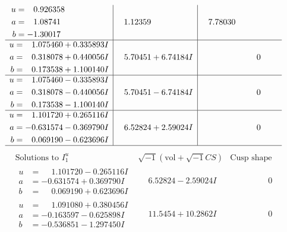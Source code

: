 \documentclass[1p]{elsarticle_modified}
\theoremstyle{definition}
\newcommand{\I}{\sqrt{-1}}
\begin{document}
$$\begin{array}{c|c|c}
\begin{aligned}
u &= \phantom{-}0.926358\phantom{ +0.000000I} \\
a &= \phantom{-}1.08741\phantom{ +0.000000I} \\
b &= -1.30017\phantom{ +0.000000I}\end{aligned}
 & \phantom{-}1.12359\phantom{ +0.000000I} & \phantom{-}7.78030\phantom{ +0.000000I} \\ \hline\begin{aligned}
u &= \phantom{-}1.075460 + 0.335893 I \\
a &= \phantom{-}0.318078 + 0.440056 I \\
b &= \phantom{-}0.173538 + 1.100140 I\end{aligned}
 & \phantom{-}5.70451 + 6.74184 I & \phantom{-0.000000 } 0 \\ \hline\begin{aligned}
u &= \phantom{-}1.075460 - 0.335893 I \\
a &= \phantom{-}0.318078 - 0.440056 I \\
b &= \phantom{-}0.173538 - 1.100140 I\end{aligned}
 & \phantom{-}5.70451 - 6.74184 I & \phantom{-0.000000 } 0 \\ \hline\begin{aligned}
u &= \phantom{-}1.101720 + 0.265116 I \\
a &= -0.631574 - 0.369790 I \\
b &= \phantom{-}0.069190 - 0.623696 I\end{aligned}
 & \phantom{-}6.52824 + 2.59024 I & \phantom{-0.000000 } 0\\
 \hline 
 \end{array}$$\newpage$$\begin{array}{c|c|c}  
\text{Solutions to }I^u_{1}& \I (\text{vol} + \sqrt{-1}CS) & \text{Cusp shape}\\
 \hline 
\begin{aligned}
u &= \phantom{-}1.101720 - 0.265116 I \\
a &= -0.631574 + 0.369790 I \\
b &= \phantom{-}0.069190 + 0.623696 I\end{aligned}
 & \phantom{-}6.52824 - 2.59024 I & \phantom{-0.000000 } 0 \\ \hline\begin{aligned}
u &= \phantom{-}1.091080 + 0.380456 I \\
a &= -0.163597 - 0.625898 I \\
b &= -0.536851 - 1.297450 I\end{aligned}
 & \phantom{-}11.5454 + 10.2862 I & \phantom{-0.000000 } 0 \\ \hline\begin{aligned}

\end{aligned}
\end{array}$$
\end{document}
